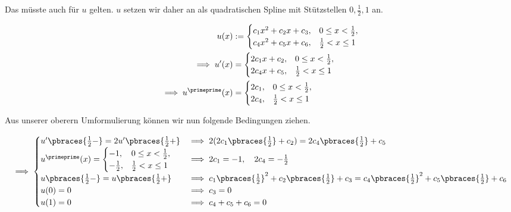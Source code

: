 \begin{solution}

Das müsste auch für $u$ gelten.
$u$ setzen wir daher an als quadratischen Spline mit Stützstellen $0, \frac{1}{2}, 1$ an.

\begin{align*}
  u(x)
  & :=
  \begin{cases}
    c_1 x^2 + c_2 x + c_3, & 0 \leq x < \frac{1}{2}, \\
    c_4 x^2 + c_5 x + c_6, & \frac{1}{2} < x \leq 1
  \end{cases} \\
  \implies
  u^\prime(x)
  & =
  \begin{cases}
    2 c_1 x + c_2, & 0 \leq x < \frac{1}{2}, \\
    2 c_4 x + c_5, & \frac{1}{2} < x \leq 1
  \end{cases} \\
  \implies
  u^\primeprime(x)
  & =
  \begin{cases}
    2 c_1, & 0 \leq x < \frac{1}{2}, \\
    2 c_4, & \frac{1}{2} < x \leq 1
  \end{cases}
\end{align*}

Aus unserer oberern Umformulierung können wir nun folgende Bedingungen ziehen.

\begin{align*}
  \implies
  \begin{cases}
    u^\prime \pbraces{\frac{1}{2} -} = 2 u^\prime \pbraces{\frac{1}{2} +}
    & \implies 2 (2 c_1 \pbraces{\frac{1}{2}} + c_2) = 2 c_4 \pbraces{\frac{1}{2}} + c_5 \\
    u^\primeprime(x)
    =
    \begin{cases}
      -1,           & 0 \leq x < \frac{1}{2}, \\
      -\frac{1}{2}, & \frac{1}{2} < x \leq 1
    \end{cases}
    & \implies 2 c_1 = -1, \quad 2 c_4 = -\frac{1}{2} \\
    u\pbraces{\frac{1}{2} -} = u\pbraces{\frac{1}{2} +}
    & \implies c_1 \pbraces{\frac{1}{2}}^2 + c_2 \pbraces{\frac{1}{2}} + c_3 = c_4 \pbraces{\frac{1}{2}}^2 + c_5 \pbraces{\frac{1}{2}} + c_6 \\
    u(0) = 0
    & \implies c_3 = 0 \\
    u(1) = 0
    & \implies c_4 + c_5 + c_6 = 0
    \end{cases}
\end{align*}


\end{solution}
